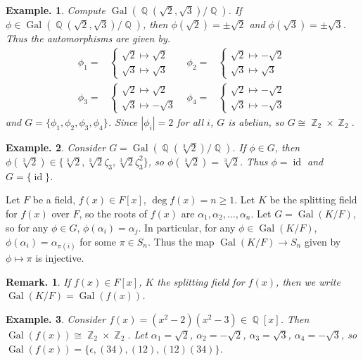 \documentclass[11pt, a4paper]{memoir}
\DeclareMathOperator{\Q}{{\mathbb{Q}}}
\DeclareMathOperator{\Z}{{\mathbb{Z}}}
\theoremstyle{change}
\theoremstyle{plain}
\theoremstyle{nonumberplain}
\newtheorem{example}{Example.}
\newtheorem{remark}{Remark.}
\DeclareMathOperator{\Gal}{Gal}
\DeclareMathOperator{\id}{id}
\numberwithin{equation}{section}
\begin{document}
\begin{example}
    Compute $\Gal(\Q(\sqrt{2},\sqrt{3})/\Q)$.
    If $\phi\in\Gal(\Q(\sqrt{2},\sqrt{3})/\Q)$, then $\phi(\sqrt{2})=\pm\sqrt{2}$ and $\phi(\sqrt{3})=\pm\sqrt{3}$.
    Thus the automorphisms are given by.
    \begin{align*}
        \phi_1=&\begin{cases}\sqrt{2}\mapsto\sqrt{2}\\\sqrt{3}\mapsto\sqrt{3}\end{cases} & \phi_2=&\begin{cases}\sqrt{2}\mapsto-\sqrt{2}\\\sqrt{3}\mapsto\sqrt{3}\end{cases}\\
        \phi_3=&\begin{cases}\sqrt{2}\mapsto\sqrt{2}\\\sqrt{3}\mapsto-\sqrt{3}\end{cases} & \phi_4=&\begin{cases}\sqrt{2}\mapsto-\sqrt{2}\\\sqrt{3}\mapsto-\sqrt{3}\end{cases}
    \end{align*}
    and $G=\{\phi_1,\phi_2,\phi_3,\phi_4\}$.
    Since $|\phi_i|=2$ for all $i$, $G$ is abelian, so $G\cong\Z_2\times\Z_2$.
\end{example}
\begin{example}
    Consider $G=\Gal(\Q(\sqrt[3]{2})/\Q)$.
    If $\phi\in G$, then $\phi(\sqrt[3]{2})\in\{\sqrt[3]{2},\sqrt[3]{2}\zeta_3,\sqrt[3]{2}\zeta_3^2\}$, so $\phi(\sqrt[3]{2})=\sqrt[3]{2}$.
    Thus $\phi=\id$ and $G=\{\id\}$.
\end{example}
Let $F$ be a field, $f(x)\in F[x]$, $\deg f(x)=n\geq 1$.
Let $K$ be the splitting field for $f(x)$ over $F$, so the roots of $f(x)$ are $\alpha_1,\alpha_2,\ldots,\alpha_n$.
Let $G=\Gal(K/F)$, so for any $\phi\in G$, $\phi(\alpha_i)=\alpha_j$.
In particular, for any $\phi\in\Gal(K/F)$, $\phi(\alpha_i)=\alpha_{\pi(i)}$ for some $\pi\in S_n$.
Thus the map $\Gal(K/F)\to S_n$ given by $\phi\mapsto\pi$ is injective.
\begin{remark}
    If $f(x)\in F[x]$, $K$ the splitting field for $f(x)$, then we write $\Gal(K/F)=\Gal(f(x))$.
\end{remark}
\begin{example}
    Consider $f(x)=(x^2-2)(x^2-3)\in\Q[x]$.
    Then $\Gal(f(x))\cong\Z_2\times\Z_2$.
    Let $\alpha_1=\sqrt{2}$, $\alpha_2=-\sqrt{2}$, $\alpha_3=\sqrt{3}$, $\alpha_4=-\sqrt{3}$, so $\Gal(f(x))=\{\epsilon,(34),(12),(12)(34)\}$.
\end{example}
\end{document}
